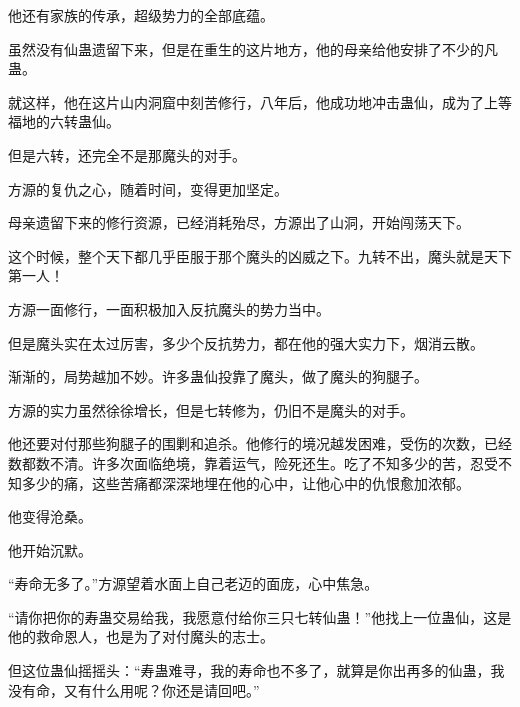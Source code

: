 \begin{this_body}
他还有家族的传承，超级势力的全部底蕴。

虽然没有仙蛊遗留下来，但是在重生的这片地方，他的母亲给他安排了不少的凡蛊。

就这样，他在这片山内洞窟中刻苦修行，八年后，他成功地冲击蛊仙，成为了上等福地的六转蛊仙。

但是六转，还完全不是那魔头的对手。

方源的复仇之心，随着时间，变得更加坚定。

母亲遗留下来的修行资源，已经消耗殆尽，方源出了山洞，开始闯荡天下。

这个时候，整个天下都几乎臣服于那个魔头的凶威之下。九转不出，魔头就是天下第一人！

方源一面修行，一面积极加入反抗魔头的势力当中。

但是魔头实在太过厉害，多少个反抗势力，都在他的强大实力下，烟消云散。

渐渐的，局势越加不妙。许多蛊仙投靠了魔头，做了魔头的狗腿子。

方源的实力虽然徐徐增长，但是七转修为，仍旧不是魔头的对手。

他还要对付那些狗腿子的围剿和追杀。他修行的境况越发困难，受伤的次数，已经数都数不清。许多次面临绝境，靠着运气，险死还生。吃了不知多少的苦，忍受不知多少的痛，这些苦痛都深深地埋在他的心中，让他心中的仇恨愈加浓郁。

他变得沧桑。

他开始沉默。

“寿命无多了。”方源望着水面上自己老迈的面庞，心中焦急。

“请你把你的寿蛊交易给我，我愿意付给你三只七转仙蛊！”他找上一位蛊仙，这是他的救命恩人，也是为了对付魔头的志士。

但这位蛊仙摇摇头：“寿蛊难寻，我的寿命也不多了，就算是你出再多的仙蛊，我没有命，又有什么用呢？你还是请回吧。”

\end{this_body}

